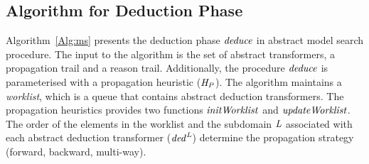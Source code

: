 


\subsection{Algorithm for Deduction Phase}
%

Algorithm~\ref{Alg:ms} presents the deduction phase $\mathit{deduce}$ in 
abstract model search procedure.  The input to the algorithm is 
the set of abstract transformers, a propagation trail and a reason 
trail.  Additionally, the procedure $\mathit{deduce}$ is parameterised with 
a propagation heuristic ($\mathit{H_P}$). 
%
The algorithm maintains a  {\em worklist}, which is a queue that contains 
abstract deduction transformers.  The propagation heuristics provides two 
functions $\mathit{initWorklist}$ and $\mathit{updateWorklist}$.
The order of the elements in the worklist and the subdomain $\mathit{L}$ 
associated with each abstract deduction transformer ($\mathit{ded}^{\mathit{L}}$) 
determine the propagation strategy (forward, backward, multi-way).

